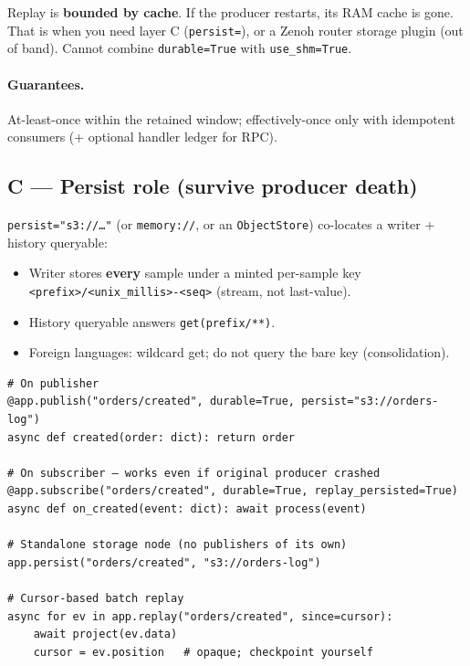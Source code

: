\documentclass[11pt,a4paper]{article}
\begin{document}
\begin{warnbox}
Replay is \textbf{bounded by cache}. If the producer restarts, its RAM cache is
gone. That is when you need layer C (\texttt{persist=}), or a Zenoh router
storage plugin (out of band). Cannot combine \texttt{durable=True} with
\texttt{use\_shm=True}.
\end{warnbox}

\paragraph{Guarantees.} At-least-once within the retained window; effectively-once
only with idempotent consumers (+ optional handler ledger for RPC).

\subsection{C --- Persist role (survive producer death)}

\texttt{persist="s3://\ldots"} (or \texttt{memory://}, or an \texttt{ObjectStore})
co-locates a writer + history queryable:

\begin{itemize}[leftmargin=*]
  \item Writer stores \textbf{every} sample under a minted per-sample key
        \texttt{<prefix>/<unix\_millis>-<seq>} (stream, not last-value).
  \item History queryable answers \texttt{get(prefix/**)}.
  \item Foreign languages: wildcard get; do not query the bare key (consolidation).
\end{itemize}

\begin{lstlisting}
# On publisher
@app.publish("orders/created", durable=True, persist="s3://orders-log")
async def created(order: dict): return order

# On subscriber — works even if original producer crashed
@app.subscribe("orders/created", durable=True, replay_persisted=True)
async def on_created(event: dict): await process(event)

# Standalone storage node (no publishers of its own)
app.persist("orders/created", "s3://orders-log")

# Cursor-based batch replay
async for ev in app.replay("orders/created", since=cursor):
    await project(ev.data)
    cursor = ev.position   # opaque; checkpoint yourself
\end{lstlisting}
\end{document}
